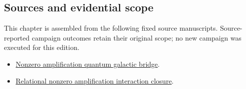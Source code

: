 \subsection{Sources and evidential
scope}\label{viii-ch12-sources-and-evidential-scope}

This chapter is assembled from the following fixed source manuscripts.
Source-reported campaign outcomes retain their original scope; no new
campaign was executed for this edition.

\begin{itemize}
\item
  \href{https://github.com/iwtbotiwtwot/SAMA/blob/4c2b5dc1649da5900c90b90d0ce56c223dbb7717/vol_iii/06-connections-between-volumes/nonzero-amplification-quantum-galactic-bridge.md}{Nonzero
  amplification quantum galactic bridge}.
\item
  \href{https://github.com/iwtbotiwtwot/SAMA/blob/4c2b5dc1649da5900c90b90d0ce56c223dbb7717/vol_iii/06-connections-between-volumes/relational-nonzero-amplification-interaction-closure.md}{Relational
  nonzero amplification interaction closure}.
\end{itemize}
